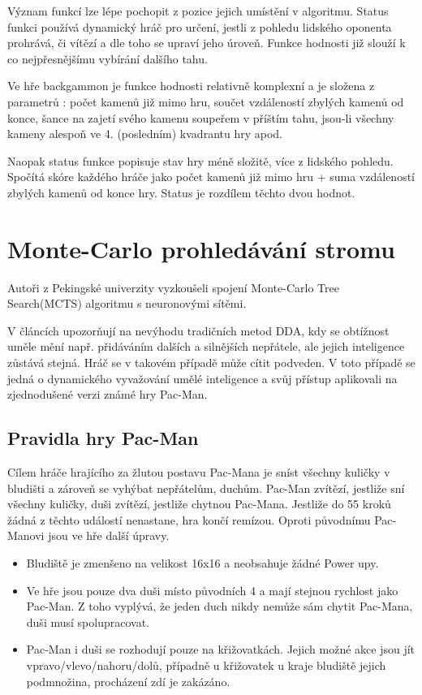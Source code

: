 Význam funkcí lze lépe pochopit z pozice jejich umístění v algoritmu. Status funkci používá dynamický hráč pro určení, jestli z pohledu lidského oponenta prohrává, či vítězí a dle toho se upraví jeho úroveň. Funkce hodnosti již slouží k co nejpřesnějšímu vybírání dalšího tahu.

Ve hře backgammon je funkce hodnosti relativně komplexní a je složena z parametrů : počet kamenů již mimo hru, součet vzdáleností zbylých kamenů od konce, šance na zajetí svého kamenu soupeřem v příštím tahu, jsou-li všechny kameny alespoň ve 4. (posledním) kvadrantu hry apod.

Naopak status funkce popisuje stav hry méně složitě, více z lidského pohledu. Spočítá skóre každého hráče jako počet kamenů již mimo hru + suma vzdáleností zbylých kamenů od konce hry. Status je rozdílem těchto dvou hodnot.

\section{Monte-Carlo prohledávání stromu} 

Autoři z Pekingské univerzity vyzkoušeli spojení Monte-Carlo Tree Search(MCTS) algoritmu s neuronovými sítěmi. \cite{18Pac1}\cite{19Pac2}

V článcích upozorňují na nevýhodu tradičních metod DDA, kdy se obtížnost uměle mění např. přidáváním dalších a silnějších nepřátele, ale jejich inteligence zůstává stejná. Hráč se v takovém případě může cítit podveden. V toto případě se jedná o dynamického vyvažování umělé inteligence a svůj přístup aplikovali na zjednodušené verzi známé hry Pac-Man.

\subsection{Pravidla hry Pac-Man}

Cílem hráče hrajícího za žlutou postavu Pac-Mana je sníst všechny kuličky v bludišti a zároveň se vyhýbat nepřátelům, duchům. Pac-Man zvítězí, jestliže sní všechny kuličky, duši zvítězí, jestliže chytnou Pac-Mana. Jestliže do 55 kroků žádná z těchto událostí nenastane, hra končí remízou. Oproti původnímu Pac-Manovi jsou ve hře další úpravy.


\begin{itemize}
	\item Bludiště je zmenšeno na velikost 16x16 a neobsahuje žádné Power upy.
	\item Ve hře jsou pouze dva duši místo původních 4 a mají stejnou rychlost jako Pac-Man. Z toho vyplývá, že jeden duch nikdy nemůže sám chytit Pac-Mana, duši musí spolupracovat.
	\item Pac-Man i duši se rozhodují pouze na křižovatkách. Jejich možné akce jsou jít vpravo/vlevo/nahoru/dolů, případně u křižovatek u kraje bludiště jejich podmnožina, procházení zdí je zakázáno.
\end{itemize}

